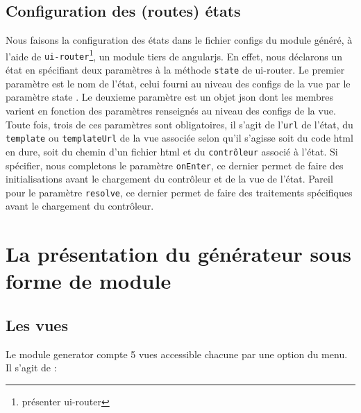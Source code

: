 \documentclass[a4paper,11pt]{report}
\begin{document}
\subsection{Configuration des (routes) états}

Nous faisons la configuration des états dans le fichier configs du module généré, à l'aide de 
{\tt ui-router}\footnote{présenter ui-router}, un module tiers de angularjs. En effet, nous
déclarons un état en spécifiant deux paramètres à la méthode {\tt state} de ui-router. Le premier 
paramètre est le nom de l'état, celui fourni au niveau des configs de la vue par le paramètre state
. Le deuxieme paramètre est un objet json dont les membres varient en fonction des paramètres renseignés 
au niveau des configs de la vue. Toute fois, trois de ces paramètres sont obligatoires, il s'agit de 
l'{\tt url} de l'état, du {\tt template} ou  {\tt templateUrl} de la vue associée  selon qu'il s'agisse 
soit du code html en dure, soit du chemin d'un fichier html et du {\tt contrôleur} associé à l'état. %
Si spécifier, nous completons le paramètre {\tt onEnter}, ce dernier permet de faire des initialisations avant 
le chargement du contrôleur et de la vue de l'état. Pareil pour le paramètre {\tt resolve}, ce dernier permet 
de faire des traitements spécifiques avant le chargement du contrôleur.


\section{La présentation du générateur sous forme de module}



\subsection{Les vues}

Le module \og generator \fg compte 5 vues accessible chacune par une option du 
menu. 
Il s'agit de :
\end{document}
